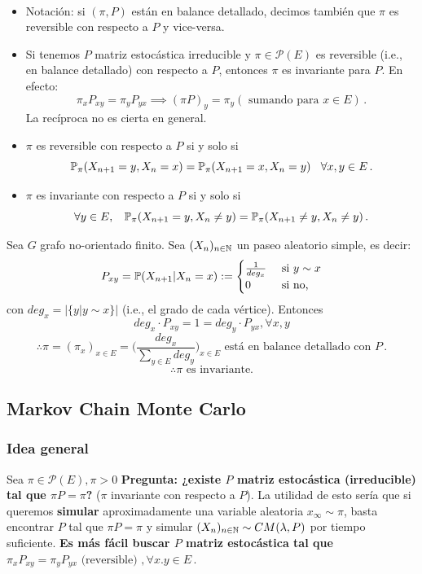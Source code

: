 \vspace{.5cm}\\
\begin{remark}
\beforeitemize
\begin{itemize}
    \item Notación: si $(\pi,P)$ están en balance detallado, decimos también que $\pi$ es reversible con respecto a $P$ y vice-versa.
    \item Si tenemos $P$ matriz estocástica irreducible y $\pi\in\mathcal{P}(E)$ es reversible (i.e., en balance detallado) con respecto a $P$,  entonces $\pi$ es invariante para $P$. En efecto: 
    $$ \pi_xP_{xy}=\pi_yP_{yx}\implies (\pi P)_y=\pi_y (\mbox{ sumando para }x\in E)\, .$$
    La recíproca no es cierta en general.
    \item $\pi$ es reversible con respecto a $P$ si y solo si  $$\P_\pi(X_{n+1}=y,X_n=x)=\P_\pi(X_{n+1}=x,X_n=y)\espacio \forall x, y \in E \,.$$
    \item $\pi$ es invariante con respecto a $P$ si y solo si %
    $$\forall y \in E,\espacio \P_\pi(X_{n+1}=y,X_n\neq y)=\P_\pi(X_{n+1}\neq y,X_n\neq y)\,.$$
\end{itemize}
\end{remark}
\begin{example}
Sea $G$ grafo no-orientado finito. Sea $(X_n)_{n\in\N}$ un paseo aleatorio simple, es decir: 
$$ P_{xy}=\P(X_{n+1}|X_n=x):=\begin{cases}
\frac{1}{deg_x}   & \mbox{ si }y\sim x\\
0   & \mbox{ si no,}
\end{cases}$$
con $deg_x=|\{y|y\sim x\}|$ (i.e., el grado de cada vértice). Entonces
$$ deg_x\cdot P_{xy}=1=deg_y \cdot P_{yx}, \forall x,y$$
$$ \therefore \pi=(\pi_x)_{x\in E}=\displaystyle\bigg(\frac{deg_x}{\sum_{y\in E}deg_y}\bigg)_{x\in E} \mbox{ está en balance detallado con }P \, .$$
$$ \therefore \pi \mbox{ es invariante.}$$
\end{example}
\subsection{Markov Chain Monte Carlo}
\subsubsection{Idea general}
Sea $\pi\in \mathcal{P}(E),\pi>0$
\newline \textbf{Pregunta: ¿existe $P$ matriz estocástica (irreducible) tal que $\pi P=\pi$?} ($\pi$ invariante con respecto a $P$).
\newp La utilidad de esto sería que si queremos \textbf{simular} aproximadamente una variable aleatoria $x_\infty\sim\pi$, basta encontrar $P$ tal que $\pi P=\pi$ y simular $(X_n)_{n\in\N}\sim \cm$ por tiempo suficiente.
\newline \textbf{Es más fácil buscar $P$ matriz estocástica tal que $\pi_xP_{xy}=\pi_yP_{yx} \mbox{ (reversible) }, \forall x.y\in E$}\,.


